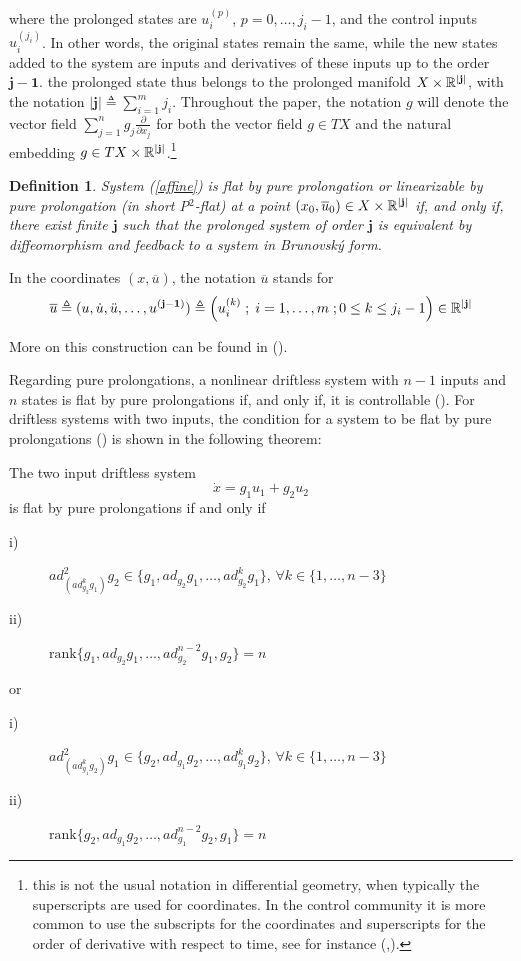 \documentclass[10pt]{article}
\newcommand{\R}{\mathbb R}
\newcommand{\3}{\mathbf{3}}
\newcommand{\2}{\mathbf{2}}
\newcommand{\1}{\mathbf{1}}
\newcommand{\0}{\mathbf{0}}
\newcommand{\mbf}[1]{\mathbf{#1}}
\newcommand{\rk}{\mathrm{rank}}
\newcommand{\ddxx}[1]{\frac{\partial}{\partial x_{#1}}}
\newcommand{\ol}[1]{\overline{#1}}
\newtheorem{definition}{Definition}
\begin{document}
where the prolonged states are $u_i^{(p)}$, $p=0, \ldots, j_{i}-1$,  and the control inputs
$u_i^{(j_i)}$. In other words, the original states remain the same, while the new states added to the system are inputs and derivatives of these inputs up to the order $\mbf{j-1}$. the prolonged state thus belongs to the prolonged manifold $X\times \mathbb{R}^{\vert \bf{j}\vert}$, with the notation $\vert \mbf{j} \vert \triangleq \sum_{i=1}^{m} j_{i}$.
Throughout the paper, the notation $g$ will denote the vector field $\sum_{j=1}^{n}g_{j}\ddxx{j}$ for both the vector field $g \in TX$ and the natural embedding
$g \in TX \times \mathbb{R}^{\vert \bf{j}\vert}$.\footnote{this is not the usual notation in differential geometry, when typically the superscripts are used for coordinates. In the control community it is more common to use the subscripts for the coordinates and superscripts for the order of derivative with respect to time, see for instance (\cite{Isidori},\cite{NVdS}).}

\begin{definition}
System (\ref{affine}) is \emph{flat by pure prolongation or linearizable by pure prolongation} (in short P$^2$-flat)
at a point $(x_{0},\ol{u}_{0}) \in X \times \mathbb{R}^{\vert \bf{j}\vert}$ if, and only if, there exist finite $\mbf{j}$
such that the prolonged system of order $\mbf{j}$ is equivalent by
diffeomorphism and feedback to a system in Brunovsk\'y form.
\end{definition}
In the coordinates $(x,\ol{u})$, the notation $\ol{u}$ stands for
$$\ol{u} \triangleq (u,\dot{u},\ddot{u},\ldots,u^{(\bf{j-1})}) \triangleq \left( u_{i}^{(k)} \; ; \; i=1,\dots,m\; ; 0 \le k \le j_i  -1\right) \in \R^{\vert \bf{j}\vert}$$

More on this construction can be found in (\cite{Levine2009,Levine2011}).

Regarding pure prolongations, a nonlinear driftless system with $n-1$ inputs and $n$ states is flat by pure prolongations if, and only if, it is controllable (\cite{IJC2008}). For driftless systems with two inputs, the condition for a system to be flat by pure prolongations (\cite{CDC2000}) is shown in the following theorem:


The two input driftless system
$$\dot{x} = g_1 u_1  + g_2 u_2$$
is flat by pure prolongations if and only if
\begin{description}
\item [i)] $\displaystyle ad^2_{\left( ad_{g_2}^{k}g_1\right)}g_2 \in
 \{g_1,ad_{g_2}g_1,\ldots,ad_{g_2}^{k}g_1 \}$,  $\forall k \in \{1,\ldots,n-3\}$
\item [ii)] $\displaystyle
\rk \{g_1,ad_{g_2}g_1,\ldots,ad_{g_2}^{n-2}g_1,g_2\}=n$
\end{description}
or
\begin{description}
\item [i)] $\displaystyle ad^2_{\left( ad_{g_1}^{k}g_2 \right)}g_1 \in \{g_2,ad_{g_1}g_2,\ldots,ad_{g_1}^{k}g_2 \}$,
  $\forall k \in \{1,\ldots,n-3\}$
\item [ii)] $\displaystyle
\rk \{ g_2,ad_{g_1}g_2,\ldots,ad_{g_1}^{n-2}g_2,g_1 \}=n$
\end{description}
\end{document}
